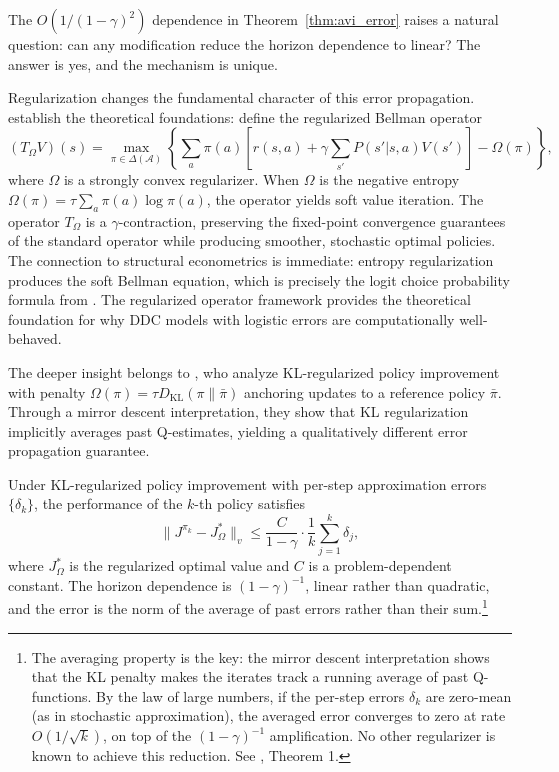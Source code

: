 The $O(1/(1-\gamma)^2)$ dependence in Theorem~\ref{thm:avi_error} raises a natural question: can any modification reduce the horizon dependence to linear? The answer is yes, and the mechanism is unique.

Regularization changes the fundamental character of this error propagation. \citet{geist2019regularized} establish the theoretical foundations: define the regularized Bellman operator
\begin{equation}
(T_\Omega V)(s) = \max_{\pi \in \Delta(\mathcal{A})} \left\{ \sum_a \pi(a) \left[ r(s,a) + \gamma \sum_{s'} P(s'|s,a) V(s') \right] - \Omega(\pi) \right\},
\end{equation}
where $\Omega$ is a strongly convex regularizer. When $\Omega$ is the negative entropy $\Omega(\pi) = \tau \sum_a \pi(a) \log \pi(a)$, the operator yields soft value iteration. The operator $T_\Omega$ is a $\gamma$-contraction, preserving the fixed-point convergence guarantees of the standard operator while producing smoother, stochastic optimal policies. The connection to structural econometrics is immediate: entropy regularization produces the soft Bellman equation, which is precisely the logit choice probability formula from \citet{Rust1987}. The regularized operator framework provides the theoretical foundation for why DDC models with logistic errors are computationally well-behaved.

The deeper insight belongs to \citet{vieillard2020}, who analyze KL-regularized policy improvement with penalty $\Omega(\pi) = \tau D_{\text{KL}}(\pi \| \bar{\pi})$ anchoring updates to a reference policy $\bar{\pi}$. Through a mirror descent interpretation, they show that KL regularization implicitly averages past Q-estimates, yielding a qualitatively different error propagation guarantee.

\begin{theorem}
\label{thm:kl_error}
Under KL-regularized policy improvement with per-step approximation errors $\{\delta_k\}$, the performance of the $k$-th policy satisfies
\[
\|J^{\pi_k} - J^*_\Omega\|_v \leq \frac{C}{1-\gamma} \cdot \frac{1}{k} \sum_{j=1}^{k} \delta_j,
\]
where $J^*_\Omega$ is the regularized optimal value and $C$ is a problem-dependent constant. The horizon dependence is $(1-\gamma)^{-1}$, linear rather than quadratic, and the error is the norm of the average of past errors rather than their sum.\footnote{The averaging property is the key: the mirror descent interpretation shows that the KL penalty makes the iterates track a running average of past Q-functions. By the law of large numbers, if the per-step errors $\delta_k$ are zero-mean (as in stochastic approximation), the averaged error converges to zero at rate $O(1/\sqrt{k})$, on top of the $(1-\gamma)^{-1}$ amplification. No other regularizer is known to achieve this reduction. See \citet{vieillard2020}, Theorem 1.}
\end{theorem}

